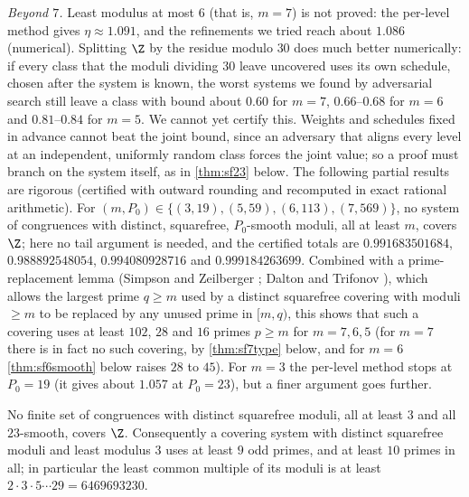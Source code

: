 \emph{Beyond $7$.} Least modulus at most $6$ (that is, $m=7$) is not proved: the per-level method gives
$\eta\approx1.091$, and the refinements we tried reach about $1.086$ (numerical). Splitting $\Z$ by the residue
modulo $30$ does much better numerically: if every class that the moduli dividing $30$ leave uncovered uses its own
schedule, chosen after the system is known, the worst systems we found by adversarial search still leave a class
with bound about $0.60$ for $m=7$, $0.66$--$0.68$ for $m=6$ and $0.81$--$0.84$ for $m=5$. We cannot yet certify
this. Weights and schedules fixed in advance cannot beat the joint bound, since an adversary that aligns every level
at an independent, uniformly random class forces the joint value; so a proof must branch on the system itself, as in
\cref{thm:sf23} below. The following partial results are rigorous (certified with outward rounding and recomputed in
exact rational arithmetic). For $(m,P_0)\in\{(3,19),(5,59),(6,113),(7,569)\}$, no system of congruences with
distinct, squarefree, $P_0$-smooth moduli, all at least $m$, covers $\Z$; here no tail argument is needed, and the
certified totals are $0.991683501684$, $0.988892548054$, $0.994080928716$ and $0.999184263699$. Combined with a
prime-replacement lemma (Simpson and Zeilberger \cite{SimpsonZeilberger1991}; Dalton and Trifonov
\cite[Lemma~13]{DaltonTrifonov2022}), which allows the largest prime $q\ge m$ used by a distinct squarefree covering
with moduli $\ge m$ to be replaced by any unused prime in $[m,q)$, this shows that such a covering uses at least
$102$, $28$ and $16$ primes $p\ge m$ for $m=7,6,5$ (for $m=7$ there is in fact no such covering, by
\cref{thm:sf7type} below, and for $m=6$ \cref{thm:sf6smooth} below raises $28$ to $45$). For $m=3$ the per-level method stops at $P_0=19$ (it gives about
$1.057$ at $P_0=23$), but a finer argument goes further.

\begin{theorem}\label{thm:sf23}
No finite set of congruences with distinct squarefree moduli, all at least $3$ and all $23$-smooth, covers $\Z$.
Consequently a covering system with distinct squarefree moduli and least modulus $3$ uses at least $9$ odd primes,
and at least $10$ primes in all; in particular the least common multiple of its moduli is at least
$2\cdot3\cdot5\cdots29=6469693230$.
\end{theorem}

